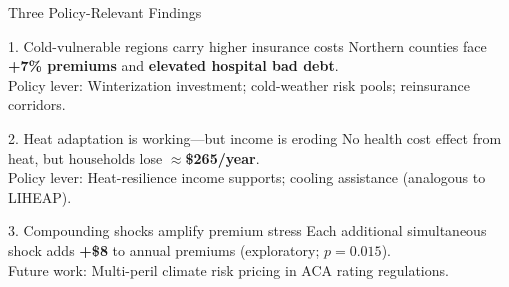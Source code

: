 \documentclass[aspectratio=169,11pt]{beamer}
\newcommand{\emphcolor}[1]{{\color{WarmOrange}\textbf{#1}}}
\newcommand{\tealtext}[1]{{\color{Teal}#1}}
\begin{document}
\begin{frame}{Three Policy-Relevant Findings}
  \small
  \begin{block}{1. Cold-vulnerable regions carry higher insurance costs}
    Northern counties face \emphcolor{+7\% premiums} and \emphcolor{elevated hospital bad debt}.\\
    \tealtext{Policy lever:} Winterization investment; cold-weather risk pools; reinsurance corridors.
  \end{block}
  \vspace{0.2em}
  \begin{block}{2. Heat adaptation is working---but income is eroding}
    No health cost effect from heat, but households lose \emphcolor{$\approx$\$265/year}.\\
    \tealtext{Policy lever:} Heat-resilience income supports; cooling assistance (analogous to LIHEAP).
  \end{block}
  \vspace{0.2em}
  \begin{alertblock}{3. Compounding shocks amplify premium stress}
    Each additional simultaneous shock adds \emphcolor{+\$8} to annual premiums (exploratory; $p=0.015$).\\
    \tealtext{Future work:} Multi-peril climate risk pricing in ACA rating regulations.
  \end{alertblock}
\end{frame}
\end{document}
